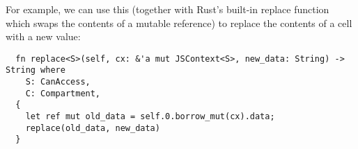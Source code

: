 For example, we can use this (together with Rust's built-in replace function
which swaps the contents of a mutable reference) to replace the contents of a cell
with a new value:
\begin{verbatim}
  fn replace<S>(self, cx: &'a mut JSContext<S>, new_data: String) -> String where
    S: CanAccess,
    C: Compartment,
  {
    let ref mut old_data = self.0.borrow_mut(cx).data;
    replace(old_data, new_data)
  }
\end{verbatim}

